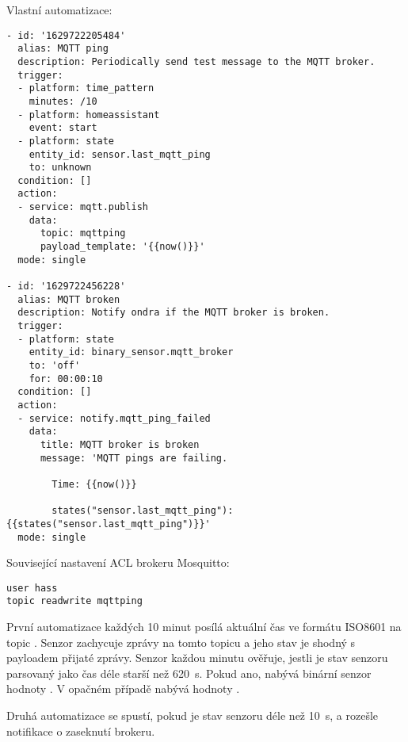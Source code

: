 Vlastní automatizace:
\begin{lstlisting}
- id: '1629722205484'
  alias: MQTT ping
  description: Periodically send test message to the MQTT broker.
  trigger:
  - platform: time_pattern
    minutes: /10
  - platform: homeassistant
    event: start
  - platform: state
    entity_id: sensor.last_mqtt_ping
    to: unknown
  condition: []
  action:
  - service: mqtt.publish
    data:
      topic: mqttping
      payload_template: '{{now()}}'
  mode: single

- id: '1629722456228'
  alias: MQTT broken
  description: Notify ondra if the MQTT broker is broken.
  trigger:
  - platform: state
    entity_id: binary_sensor.mqtt_broker
    to: 'off'
    for: 00:00:10
  condition: []
  action:
  - service: notify.mqtt_ping_failed
    data:
      title: MQTT broker is broken
      message: 'MQTT pings are failing.

        Time: {{now()}}

        states("sensor.last_mqtt_ping"): {{states("sensor.last_mqtt_ping")}}'
  mode: single
\end{lstlisting}


Související nastavení ACL brokeru Mosquitto:
\begin{verbatim}
user hass
topic readwrite mqttping
\end{verbatim}


První automatizace každých 10 minut posílá aktuální čas ve formátu ISO8601 na
topic . Senzor  zachycuje
zprávy na tomto topicu a jeho stav je shodný s payloadem přijaté zprávy.
Senzor  každou minutu ověřuje, jestli je
stav senzoru  parsovaný jako čas déle starší
než \SI{620}{\second}. Pokud ano, nabývá binární senzor hodnoty .
V opačném případě nabývá hodnoty .

Druhá automatizace se spustí, pokud je stav senzoru
  déle než \SI{10}{\second},
a rozešle notifikace o zaseknutí brokeru.
